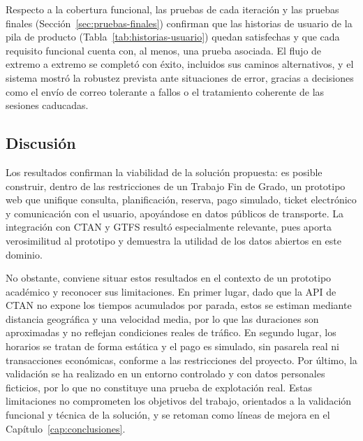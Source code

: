 Respecto a la cobertura funcional, las pruebas de cada iteración y las pruebas finales (Sección~\ref{sec:pruebas-finales}) confirman que las historias de usuario de la pila de producto (Tabla~\ref{tab:historias-usuario}) quedan satisfechas y que cada requisito funcional cuenta con, al menos, una prueba asociada. El flujo de extremo a extremo se completó con éxito, incluidos sus caminos alternativos, y el sistema mostró la robustez prevista ante situaciones de error, gracias a decisiones como el envío de correo tolerante a fallos o el tratamiento coherente de las sesiones caducadas.

\subsection{Discusión}

Los resultados confirman la viabilidad de la solución propuesta: es posible construir, dentro de las restricciones de un Trabajo Fin de Grado, un prototipo web que unifique consulta, planificación, reserva, pago simulado, ticket electrónico y comunicación con el usuario, apoyándose en datos públicos de transporte. La integración con CTAN y GTFS resultó especialmente relevante, pues aporta verosimilitud al prototipo y demuestra la utilidad de los datos abiertos en este dominio.

No obstante, conviene situar estos resultados en el contexto de un prototipo académico y reconocer sus limitaciones. En primer lugar, dado que la API de CTAN no expone los tiempos acumulados por parada, estos se estiman mediante distancia geográfica y una velocidad media, por lo que las duraciones son aproximadas y no reflejan condiciones reales de tráfico. En segundo lugar, los horarios se tratan de forma estática y el pago es simulado, sin pasarela real ni transacciones económicas, conforme a las restricciones del proyecto. Por último, la validación se ha realizado en un entorno controlado y con datos personales ficticios, por lo que no constituye una prueba de explotación real. Estas limitaciones no comprometen los objetivos del trabajo, orientados a la validación funcional y técnica de la solución, y se retoman como líneas de mejora en el Capítulo~\ref{cap:conclusiones}.
